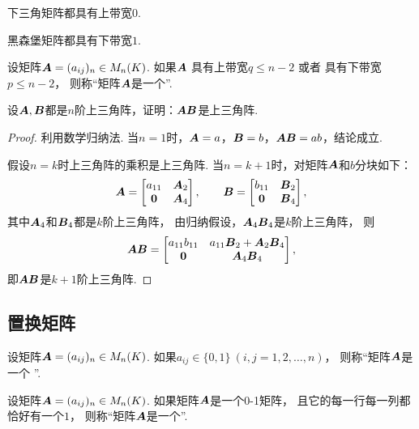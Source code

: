 \begin{example}
下三角矩阵都具有上带宽\(0\).
\end{example}

\begin{example}
黑森堡矩阵都具有下带宽\(1\).
\end{example}

\begin{definition}
设矩阵\(\boldsymbol{A}=(a_{ij})_n \in M_n(K)\).
如果\(\boldsymbol{A}\)
具有上带宽\(q \leq n-2\)
或者
具有下带宽\(p \leq n-2\)，
则称“矩阵\(\boldsymbol{A}\)是一个”.
\end{definition}

\begin{example}
设\(\boldsymbol{A},\boldsymbol{B}\)都是\(n\)阶上三角阵，证明：\(\boldsymbol{A}\boldsymbol{B}\)是上三角阵.
\begin{proof}
利用数学归纳法.
当\(n=1\)时，\(\boldsymbol{A}=a\)，\(\boldsymbol{B}=b\)，\(\boldsymbol{A}\boldsymbol{B} = ab\)，结论成立.

假设\(n=k\)时上三角阵的乘积是上三角阵.
当\(n=k+1\)时，对矩阵\(\boldsymbol{A}\)和\(b\)分块如下：\begin{equation*}
	\boldsymbol{A} = \begin{bmatrix}
		a_{11} & \boldsymbol{A}_2 \\
		\boldsymbol0 & \boldsymbol{A}_4
	\end{bmatrix},
	\qquad
	\boldsymbol{B} = \begin{bmatrix}
		b_{11} & \boldsymbol{B}_2 \\
		\boldsymbol0 & \boldsymbol{B}_4
	\end{bmatrix},
\end{equation*}
其中\(\boldsymbol{A}_4\)和\(\boldsymbol{B}_4\)都是\(k\)阶上三角阵，
由归纳假设，\(\boldsymbol{A}_4 \boldsymbol{B}_4\)是\(k\)阶上三角阵，
则\begin{equation*}
	\boldsymbol{A}\boldsymbol{B} = \begin{bmatrix}
		a_{11} b_{11} & a_{11} \boldsymbol{B}_2 + \boldsymbol{A}_2 \boldsymbol{B}_4 \\
		\boldsymbol0 & \boldsymbol{A}_4 \boldsymbol{B}_4
	\end{bmatrix},
\end{equation*}
即\(\boldsymbol{A}\boldsymbol{B}\)是\(k+1\)阶上三角阵.
\end{proof}
\end{example}

\subsection{置换矩阵}
\begin{definition}
设矩阵\(\boldsymbol{A}=(a_{ij})_n \in M_n(K)\).
如果\(a_{ij} \in \{0,1\}\ (i,j=1,2,\dotsc,n)\)，
则称“矩阵\(\boldsymbol{A}\)是一个 ”.
\end{definition}
\begin{definition}
设矩阵\(\boldsymbol{A}=(a_{ij})_n \in M_n(K)\).
如果矩阵\(\boldsymbol{A}\)是一个0-1矩阵，
且它的每一行每一列都恰好有一个\(1\)，
则称“矩阵\(\boldsymbol{A}\)是一个”.
\end{definition}

